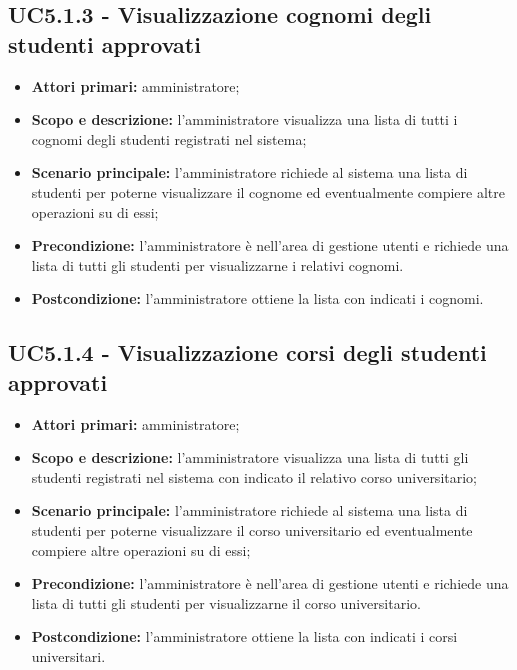 \documentclass[AnalisiDeiRequisiti.tex]{subfiles}
\begin{document}
\subsection{UC5.1.3 - Visualizzazione cognomi degli studenti approvati}
\begin{itemize}
	\item \textbf{Attori primari:} amministratore;
	\item \textbf{Scopo e descrizione:} l'amministratore visualizza una lista di tutti i cognomi degli studenti registrati nel sistema;
	\item \textbf{Scenario principale:} l'amministratore richiede al sistema una lista di studenti per poterne visualizzare il cognome ed eventualmente compiere altre operazioni su di essi;
	\item \textbf{Precondizione:} l'amministratore è nell'area di gestione utenti e richiede una lista di tutti gli studenti per visualizzarne i relativi cognomi.
	\item \textbf{Postcondizione:} l'amministratore ottiene la lista con indicati i cognomi.
\end{itemize}
\subsection{UC5.1.4 - Visualizzazione corsi degli studenti approvati}
\begin{itemize}
	\item \textbf{Attori primari:} amministratore;
	\item \textbf{Scopo e descrizione:} l'amministratore visualizza una lista di tutti gli studenti registrati nel sistema con indicato il relativo corso universitario;
	\item \textbf{Scenario principale:} l'amministratore richiede al sistema una lista di studenti per poterne visualizzare il corso universitario ed eventualmente compiere altre operazioni su di essi;
	\item \textbf{Precondizione:} l'amministratore è nell'area di gestione utenti e richiede una lista di tutti gli studenti per visualizzarne il corso universitario.
	\item \textbf{Postcondizione:} l'amministratore ottiene la lista con indicati i corsi universitari.
\end{itemize}
\end{document}
